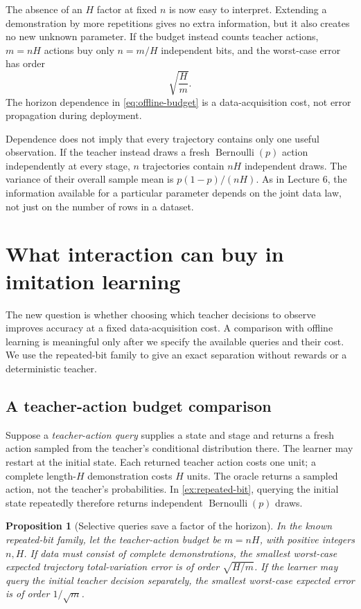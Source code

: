 \documentclass[11pt,twoside]{article}
\newtheorem{proposition}[theorem]{Proposition}
\theoremstyle{definition}
\theoremstyle{remark}
\begin{document}
The absence of an $H$ factor at fixed $n$ is now easy to interpret.
Extending a demonstration by more repetitions gives no extra information,
but it also creates no new unknown parameter. If the budget instead counts
teacher actions, $m=nH$ actions buy only $n=m/H$ independent bits, and
the worst-case error has order
\begin{equation}
 \sqrt{\frac Hm}.
 \label{eq:offline-budget}
\end{equation}
The horizon dependence in \cref{eq:offline-budget} is a data-acquisition
cost, not error propagation during deployment.

Dependence does not imply that every trajectory contains only one useful
observation. If the teacher instead draws a fresh
$\operatorname{Bernoulli}(p)$ action independently at every stage, $n$
trajectories contain $nH$ independent draws. The variance of their overall
sample mean is $p(1-p)/(nH)$. As in Lecture 6, the information available
for a particular parameter depends on the joint data law, not just on the
number of rows in a dataset.

\section{What interaction can buy in imitation learning}
\label{sec:interaction}

The new question is whether choosing which teacher decisions to observe
improves accuracy at a fixed data-acquisition cost.
A comparison with offline learning is meaningful only after we
specify the available queries and their cost. We use the repeated-bit family
to give an exact separation without rewards or a deterministic teacher.

\subsection{A teacher-action budget comparison}

Suppose a \emph{teacher-action query} supplies a state and stage and returns a
fresh action sampled from the teacher's conditional distribution there.
The learner may restart at the initial state. Each returned teacher action
costs one unit; a complete length-$H$ demonstration costs $H$ units.
The oracle returns a sampled action, not the teacher's probabilities.
In \cref{ex:repeated-bit}, querying the initial state repeatedly therefore
returns independent $\operatorname{Bernoulli}(p)$ draws.

\begin{proposition}[Selective queries save a factor of the horizon]
\label{prop:interaction}
In the known repeated-bit family, let the teacher-action budget be
$m=nH$, with positive integers $n,H$. If data must consist of complete
demonstrations, the smallest worst-case expected trajectory
total-variation error is of order $\sqrt{H/m}$.
If the learner may query the initial teacher decision separately, the
smallest worst-case expected error is of order $1/\sqrt m$.
\end{proposition}
\end{document}
